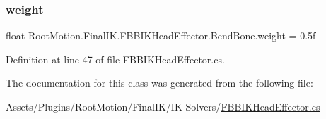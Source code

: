 \subsubsection{\texorpdfstring{weight}{weight}}
{\footnotesize\ttfamily float Root\+Motion.\+Final\+I\+K.\+F\+B\+B\+I\+K\+Head\+Effector.\+Bend\+Bone.\+weight = 0.\+5f}



Definition at line 47 of file F\+B\+B\+I\+K\+Head\+Effector.\+cs.



The documentation for this class was generated from the following file\+:\begin{DoxyCompactItemize}
\item 
Assets/\+Plugins/\+Root\+Motion/\+Final\+I\+K/\+I\+K Solvers/\mbox{\hyperlink{_f_b_b_i_k_head_effector_8cs}{F\+B\+B\+I\+K\+Head\+Effector.\+cs}}\end{DoxyCompactItemize}
